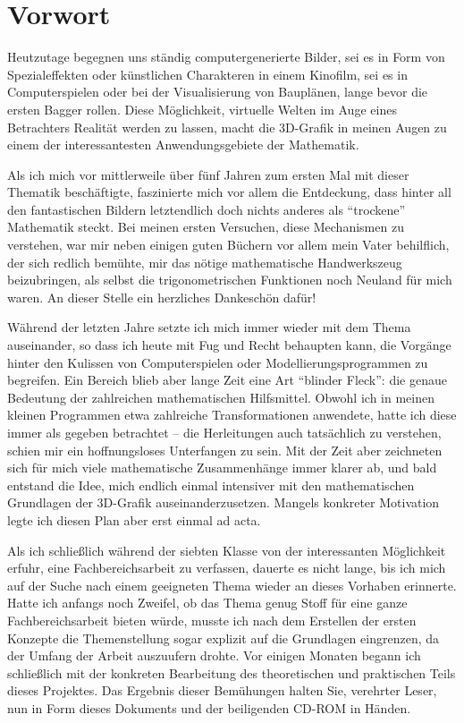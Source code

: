 \chapter*{Vorwort}

Heutzutage begegnen uns ständig computergenerierte Bilder, sei es in Form von Spezialeffekten oder künstlichen Charakteren in einem Kinofilm, sei es in Computerspielen oder bei der Visualisierung von Bauplänen, lange bevor die ersten Bagger rollen. Diese Möglichkeit, virtuelle Welten im Auge eines Betrachters Realität werden zu lassen, macht die 3D-Grafik in meinen Augen zu einem der interessantesten Anwendungsgebiete der Mathematik.

Als ich mich vor mittlerweile über fünf Jahren zum ersten Mal mit dieser Thematik beschäftigte, faszinierte mich vor allem die Entdeckung, dass hinter all den fantastischen Bildern letztendlich doch nichts anderes als \enquote{trockene} Mathematik steckt. Bei meinen ersten Versuchen, diese Mechanismen zu verstehen, war mir neben einigen guten Büchern vor allem mein Vater behilflich, der sich redlich bemühte, mir das nötige mathematische Handwerkszeug beizubringen, als selbst die trigonometrischen Funktionen noch Neuland für mich waren. An dieser Stelle ein herzliches Dankeschön dafür!

Während der letzten Jahre setzte ich mich immer wieder mit dem Thema auseinander, so dass ich heute mit Fug und Recht behaupten kann, die Vorgänge hinter den Kulissen von Computerspielen oder Modellierungsprogrammen zu begreifen. Ein Bereich blieb aber lange Zeit eine Art \enquote{blinder Fleck}: die genaue Bedeutung der zahlreichen mathematischen Hilfsmittel. Obwohl ich in meinen kleinen Programmen etwa zahlreiche Transformationen anwendete, hatte ich diese immer als gegeben betrachtet -- die Herleitungen auch tatsächlich zu verstehen, schien mir ein hoffnungsloses Unterfangen zu sein. Mit der Zeit aber zeichneten sich für mich viele mathematische Zusammenhänge immer klarer ab, und bald entstand die Idee, mich endlich einmal intensiver mit den mathematischen Grundlagen der 3D-Grafik auseinanderzusetzen. Mangels konkreter Motivation legte ich diesen Plan aber erst einmal ad acta.

Als ich schließlich während der siebten Klasse von der interessanten Möglichkeit erfuhr, eine Fachbereichsarbeit zu verfassen, dauerte es nicht lange, bis ich mich auf der Suche nach einem geeigneten Thema wieder an dieses Vorhaben erinnerte. Hatte ich anfangs noch Zweifel, ob das Thema genug Stoff für eine ganze Fachbereichsarbeit bieten würde, musste ich nach dem Erstellen der ersten Konzepte die Themenstellung sogar explizit auf die Grundlagen eingrenzen, da der Umfang der Arbeit auszuufern drohte. Vor einigen Monaten begann ich schließlich mit der konkreten Bearbeitung des theoretischen und praktischen Teils dieses Projektes. Das Ergebnis dieser Bemühungen halten Sie, verehrter Leser, nun in Form dieses Dokuments und der beiligenden CD-ROM in Händen.

